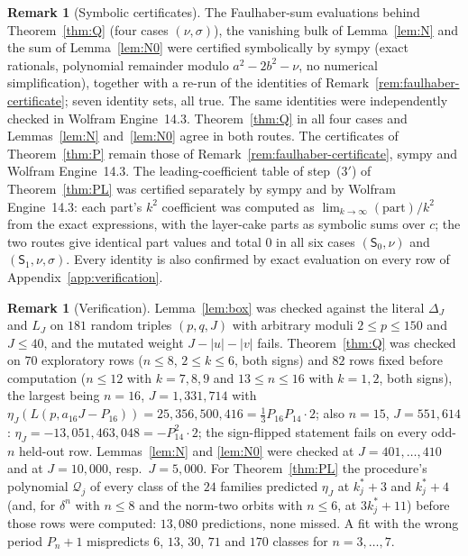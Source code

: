 \documentclass[11pt]{article}
\theoremstyle{definition}
\newtheorem{remark}[theorem]{Remark}
\begin{document}
\begin{remark}[Symbolic certificates]
\label{rem:period-certificates}
The Faulhaber-sum evaluations behind Theorem~\ref{thm:Q} (four cases
$(\nu,\sigma)$), the vanishing bulk of Lemma~\ref{lem:N} and the sum of
Lemma~\ref{lem:N0} were certified symbolically by sympy (exact
rationals, polynomial remainder modulo $a^2-2b^2-\nu$, no numerical
simplification), together with a re-run of the identities of
Remark~\ref{rem:faulhaber-certificate}; seven identity sets, all true.
The same identities were independently checked in Wolfram
Engine~14.3.  Theorem~\ref{thm:Q} in all four cases and
Lemmas~\ref{lem:N} and~\ref{lem:N0} agree in both routes.  The
certificates of Theorem~\ref{thm:P} remain those of
Remark~\ref{rem:faulhaber-certificate}, sympy and Wolfram Engine~14.3.
The leading-coefficient table of step~(3$'$) of Theorem~\ref{thm:PL}
was certified separately by sympy and by Wolfram
Engine~14.3: each part's $k^2$ coefficient was computed as
$\lim_{k\to\infty}(\text{part})/k^2$ from the exact expressions, with
the layer-cake parts as symbolic sums over $c$; the two routes give
identical part values and total $0$ in all six cases $(\mathsf S_0,\nu)$
and $(\mathsf S_1,\nu,\sigma)$.
Every identity is also confirmed by exact evaluation on every row of
Appendix~\ref{app:verification}.
\end{remark}

\begin{remark}[Verification]
\label{rem:period-verification}
Lemma~\ref{lem:box} was checked against the literal $\Delta_J$ and $L_J$
on $181$ random triples $(p,q,J)$ with arbitrary moduli $2\leq p\leq150$
and $J\leq40$, and the mutated weight $J-|u|-|v|$ fails.
Theorem~\ref{thm:Q} was checked on $70$ exploratory rows ($n\leq8$,
$2\leq k\leq6$, both signs) and $82$ rows fixed before computation
($n\leq12$ with $k=7,8,9$ and $13\leq n\leq16$ with $k=1,2$, both
signs), the largest being $n=16$, $J=1{,}331{,}714$ with
$\eta_J(L(p,a_{16}J-P_{16}))=25{,}356{,}500{,}416=\frac13P_{16}P_{14}\cdot2$;
also $n=15$, $J=551{,}614$: $\eta_J=-13{,}051{,}463{,}048=-P_{14}^2\cdot2$;
the sign-flipped statement fails on every odd-$n$ held-out row.
Lemmas~\ref{lem:N} and \ref{lem:N0} were checked at $J=401,\ldots,410$
and at $J=10{,}000$, resp.\ $J=5{,}000$.  For Theorem~\ref{thm:PL} the
procedure's polynomial $\mathcal Q_j$ of every class of the $24$
families predicted $\eta_J$ at $k^*_j+3$ and $k^*_j+4$ (and, for
$\delta^n$ with $n\leq8$ and the norm-two orbits with $n\leq6$, at
$3k^*_j+11$) before those rows were computed: $13{,}080$ predictions,
none missed.  A fit with the wrong period $P_n+1$ mispredicts $6$, $13$,
$30$, $71$ and $170$ classes for $n=3,\ldots,7$.
\end{remark}
\end{document}
